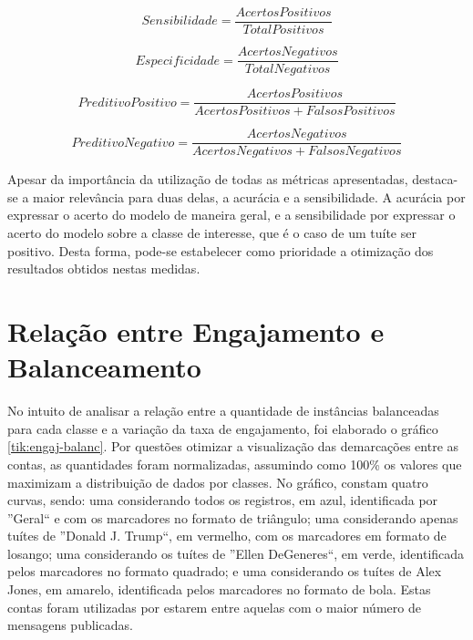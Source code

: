 \documentclass[oneside,openright,12pt]{ufsm_2015} %
\begin{document}
    \begin{equation} \label{eq:sensibilidade}
    Sensibilidade = \frac{AcertosPositivos}{TotalPositivos}
    \end{equation}
    
    \begin{equation} \label{eq:especificidade}
    Especificidade = \frac{AcertosNegativos}{TotalNegativos}
    \end{equation}
    
    \begin{equation} \label{eq:predit-pos}
    PreditivoPositivo = \frac{AcertosPositivos}{AcertosPositivos + FalsosPositivos}
    \end{equation}
    
    \begin{equation} \label{eq:predit-neg}
    PreditivoNegativo = \frac{AcertosNegativos}{AcertosNegativos + FalsosNegativos}
    \end{equation}
    
    \par Apesar da importância da utilização de todas as métricas apresentadas, destaca-se a maior relevância para duas delas, a acurácia e a sensibilidade. A acurácia por expressar o acerto do modelo de maneira geral, e a sensibilidade por expressar o acerto do modelo sobre a classe de interesse, que é o caso de um tuíte ser positivo. Desta forma, pode-se estabelecer como prioridade a otimização dos resultados obtidos nestas medidas.
    

\section{Relação entre Engajamento e Balanceamento}
\label{sec:exp-engaj-balanc}

    \par No intuito de analisar a relação entre a quantidade de instâncias balanceadas para cada classe e a variação da taxa de engajamento, foi elaborado o gráfico \ref{tik:engaj-balanc}. Por questões otimizar a visualização das demarcações entre as contas, as quantidades foram normalizadas, assumindo como 100\% os valores que maximizam a distribuição de dados por classes. No gráfico, constam quatro curvas, sendo: uma considerando todos os registros, em azul, identificada por ''Geral`` e com os marcadores no formato de triângulo; uma considerando apenas tuítes de ''Donald J. Trump``, em vermelho, com os marcadores em formato de losango; uma considerando os tuítes de ''Ellen DeGeneres``, em verde, identificada pelos marcadores no formato quadrado; e uma considerando os tuítes de Alex Jones, em amarelo, identificada pelos marcadores no formato de bola. Estas contas foram utilizadas por estarem entre aquelas com o maior número de mensagens publicadas.
    
\end{document}
